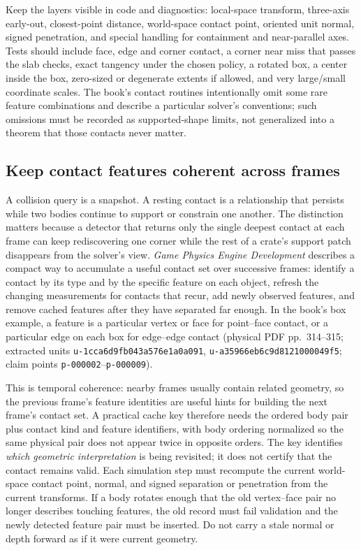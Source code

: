 Keep the layers visible in code and diagnostics: local-space transform, three-axis early-out, closest-point distance, world-space contact point, oriented unit normal, signed penetration, and special handling for containment and near-parallel axes. Tests should include face, edge and corner contact, a corner near miss that passes the slab checks, exact tangency under the chosen policy, a rotated box, a center inside the box, zero-sized or degenerate extents if allowed, and very large/small coordinate scales. The book's contact routines intentionally omit some rare feature combinations and describe a particular solver's conventions; such omissions must be recorded as supported-shape limits, not generalized into a theorem that those contacts never matter.

\subsection{Keep contact features coherent across frames}\label{06-engine-ii-ch033-keep-contact-features-coherent-across-frames}

A collision query is a snapshot. A resting contact is a relationship that persists while two bodies continue to support or constrain one another. The distinction matters because a detector that returns only the single deepest contact at each frame can keep rediscovering one corner while the rest of a crate's support patch disappears from the solver's view. \emph{Game Physics Engine Development} describes a compact way to accumulate a useful contact set over successive frames: identify a contact by its type and by the specific feature on each object, refresh the changing measurements for contacts that recur, add newly observed features, and remove cached features after they have separated far enough. In the book's box example, a feature is a particular vertex or face for point--face contact, or a particular edge on each box for edge--edge contact (physical PDF pp.~314--315; extracted units \texttt{u-1cca6d9fb043a576e1a0a091}, \texttt{u-a35966eb6c9d8121000049f5}; claim points \texttt{p-000002}--\texttt{p-000009}).

This is temporal coherence: nearby frames usually contain related geometry, so the previous frame's feature identities are useful hints for building the next frame's contact set. A practical cache key therefore needs the ordered body pair plus contact kind and feature identifiers, with body ordering normalized so the same physical pair does not appear twice in opposite orders. The key identifies \emph{which geometric interpretation} is being revisited; it does not certify that the contact remains valid. Each simulation step must recompute the current world-space contact point, normal, and signed separation or penetration from the current transforms. If a body rotates enough that the old vertex--face pair no longer describes touching features, the old record must fail validation and the newly detected feature pair must be inserted. Do not carry a stale normal or depth forward as if it were current geometry.

